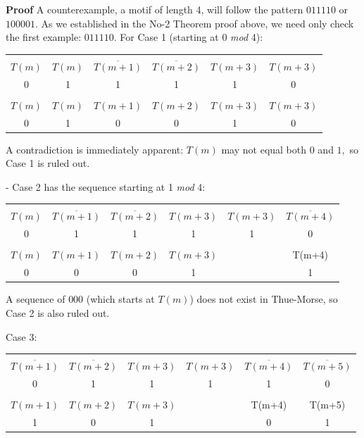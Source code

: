 \documentclass{article}
\begin{document}
\textbf{Proof} A counterexample, a motif of length 4, will follow the pattern $011110$ or $100001.$ As we established in the No-2 Theorem proof above, we need only check the first example: $011110.$ For Case 1 (starting at 0 \emph{mod} 4):

\begin{center}
\begin{tabular}{ |c|c|c|c|c|c| } 
 \hline
 &&&&&\\
$T(m)$ & $T(m)$ & $\overline{T(m+1)}$ & $\overline{T(m+2)}$ & $T(m+3)$ & $T(m+3)$ \\ 
0 & 1 & 1 & 1 & 1 & 0 \\
\hline
&&&&&\\
$T(m)$ & $T(m)$ & $T(m+1)$ & $T(m+2)$ & $T(m+3)$ & $T(m+3)$ \\
0 & 1 & 0 & 0 & 1 & 0 \\
 \hline
\end{tabular}
\end{center}

A contradiction is immediately apparent: $T(m)$ may not equal both $0$ and $1,$ so Case 1 is ruled out.

- Case 2 has the sequence starting at 1 \emph{mod} 4:

\begin{center}
\begin{tabular}{ |c|c|c|c|c|c| } 
 \hline
 &&&&&\\
$T(m)$ & $\overline{T(m+1)}$ & $\overline{T(m+2)}$ & $T(m+3)$ & $T(m+3)$ & $\overline{T(m+4)}$ \\ 
0 & 1 & 1 & 1 & 1 & 0 \\
\hline
&&&&&\\
$T(m)$ & $T(m+1)$ & $T(m+2)$ & $T(m+3)$ & & T(m+4) \\
0 & 0 & 0 & 1 & & 1 \\
 \hline
\end{tabular}
\end{center}

A sequence of $000$ (which starts at $T(m)$) does not exist in Thue-Morse, so Case 2 is also ruled out.

Case 3:

\begin{center}
\begin{tabular}{ |c|c|c|c|c|c| } 
 \hline
 &&&&&\\
$\overline{T(m+1)}$ & $\overline{T(m+2)}$ & $T(m+3)$ & $T(m+3)$ & $\overline{T(m+4)}$ & $\overline{T(m+5)}$ \\ 
0 & 1 & 1 & 1 & 1 & 0 \\
\hline
&&&&&\\
$T(m+1)$ & $T(m+2)$ & $T(m+3)$ & & T(m+4) & T(m+5) \\
1 & 0 & 1 & & 0 & 1 \\
 \hline
\end{tabular}
\end{center}
\end{document}
